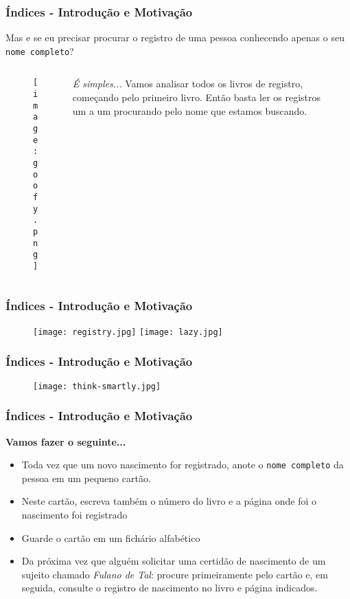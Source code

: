\documentclass[t, 10pt, aspectratio=169, table, x11names]{beamer}
\begin{document}
	\begin{frame}
		\frametitle{Índices - Introdução e Motivação}
		Mas e se eu precisar procurar o registro de uma pessoa conhecendo apenas o seu \texttt{nome completo}?
		\bigskip
		\begin{columns}[t]
			\begin{column}{0.40\textwidth}
				\begin{figure}[h]
					\texttt{[image: goofy.png]}
				\end{figure}
			\end{column}
			\begin{column}{0.50\textwidth}
				\bigskip
				
				\textit{É simples...} Vamos analisar todos os livros de registro, começando pelo primeiro livro. Então basta ler os registros um a um procurando pelo nome que estamos buscando.
			\end{column}
			\begin{column}{0.05\textwidth}
			\end{column}
		\end{columns}
	\end{frame}

	\begin{frame}
		\frametitle{Índices - Introdução e Motivação}
		\bigskip
		\begin{figure}[h]
			\centering
			\texttt{[image: registry.jpg]}
			\texttt{[image: lazy.jpg]}
		\end{figure}
	\end{frame}

	\begin{frame}
		\frametitle{Índices - Introdução e Motivação}
		\bigskip
		\begin{figure}[h]
			\centering
			\texttt{[image: think-smartly.jpg]}
		\end{figure}
	\end{frame}

	\begin{frame}
		\frametitle{Índices - Introdução e Motivação}
		\textbf{Vamos fazer o seguinte...}
		\bigskip
		\begin{itemize}
			\item Toda vez que um novo nascimento for registrado, anote o \texttt{nome completo} da pessoa em um pequeno cartão.
			\bigskip
			\item Neste cartão, escreva também o número do livro e a página onde foi o nascimento foi registrado
			\bigskip
			\item Guarde o cartão em um fichário alfabético
			\bigskip
			\item Da próxima vez que alguém solicitar uma certidão de nascimento de um sujeito chamado \textit{Fulano de Tal}: procure primeiramente pelo cartão e, em seguida, consulte o registro de nascimento no livro e página indicados.
		\end{itemize}
	\end{frame}
\end{document}
